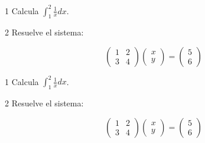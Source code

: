 \documentclass[11pt]{article}
\title{#1}\author{#2}\date{}%
\begin{document}

\begin{clproblem}{1}{}
Calcula \(\int_{1}^{2} \frac{1}{x}dx\).

\end{clproblem}

\begin{clproblem}{2}{}
Resuelve el sistema:

\[
\begin{pmatrix}1 & 2 \\ 3 & 4\end{pmatrix} \begin{pmatrix}x \\ y\end{pmatrix} = \begin{pmatrix}5 \\ 6\end{pmatrix}
\]
\end{clproblem}

\clcutline
{}

\begin{clproblem}{1}{}
Calcula \(\int_{1}^{2} \frac{1}{x}dx\).

\end{clproblem}

\begin{clproblem}{2}{}
Resuelve el sistema:

\[
\begin{pmatrix}1 & 2 \\ 3 & 4\end{pmatrix} \begin{pmatrix}x \\ y\end{pmatrix} = \begin{pmatrix}5 \\ 6\end{pmatrix}
\]
\end{clproblem}
\end{document}
